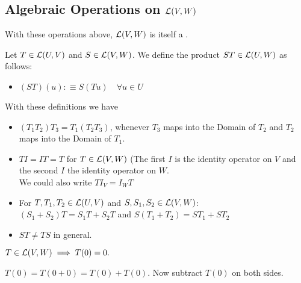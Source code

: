 \subsection{Algebraic Operations on $\mathcal{L}(V,W)$}

\setcounter{thm}{5}
\begin{thm}
  With these operations above, ${\mathcal{L}(V,W)}$ is itself a \vs.
\end{thm}

\setcounter{thm}{6}
\begin{mydef}
  Let $T \in {\mathcal{L}(U, V)}$ and $S \in {\mathcal{L}(V, W)}$. We define the product $ST \in {\mathcal{L}(U, W)}$ as follows:
  \begin{itemize}
    \item[] $(ST)(u) :\equiv S(Tu) \quad \forall u \in U$
  \end{itemize}
\end{mydef}

\begin{thm}
  With these definitions we have
  \begin{itemize}
    \item {} $(T_1 T_2) T_3 = T_1 (T_2 T_3)$, whenever $T_3$ maps into the Domain of $T_2$ and $T_2$ maps into the Domain of $T_1$.
    \item {} $T I = I T = T$ for $T \in {\mathcal{L}(V,W)}$ (The first $I$ is the identity operator on $V$ and the second $I$ the identity operator on $W$. \\
    We could also write $T I_V = I_W T$
    \item {} For $T, T_1, T_2 \in {\mathcal{L}(U, V)}$ and $S, S_1, S_2 \in {\mathcal{L}(V, W)}$: \\ $(S_1 + S_2)T=S_1 T + S_2 T$ and $S(T_1 + T_2)=S T_1 + S T_2$
    \item {} $ST \neq TS$ in general.
  \end{itemize}
\end{thm}

\setcounter{thm}{9}
\begin{thm}
  $T\in {\mathcal{L}(V,W)} \implies T(0)=0.$
\end{thm}
\begin{prf}
  $T(0) = T(0+0) = T(0) + T(0)$. Now subtract $T(0)$ on both sides.
  
\end{prf}